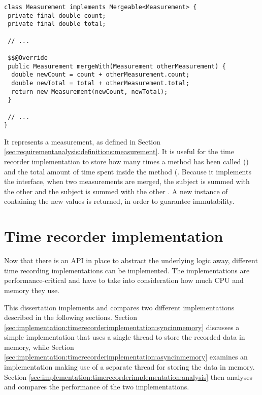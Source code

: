 \noindent\begin{minipage}[c]{\linewidth}
\begin{lstlisting}[breaklines,caption={Measurement class definition},label=lis:timerecorderapi:measurementclassdefinition]
class Measurement implements Mergeable<Measurement> {
 private final double count;
 private final double total;

 // ...

 $$@Override
 public Measurement mergeWith(Measurement otherMeasurement) {
  double newCount = count + otherMeasurement.count;
  double newTotal = total + otherMeasurement.total;
  return new Measurement(newCount, newTotal);
 }

 // ...
}
\end{lstlisting}
\end{minipage}

\noindent It represents a measurement, as defined in Section \ref{sec:requirementanalysis:definitions:measurement}. It is useful for the time recorder implementation to store how many times a method has been called () and the total amount of time spent inside the method (. Because it implements the  interface, when two measurements are merged, the subject  is summed with the other  and the subject  is summed with the other . A new instance of  containing the new values is returned, in order to guarantee immutability.

\section{Time recorder implementation}
\label{sec:implementation:timerecorderimplementation}

Now that there is an API in place to abstract the underlying logic away, different time recording implementations can be implemented. The implementations are performance-critical and have to take into consideration how much CPU and memory they use.

\noindent This dissertation implements and compares two different implementations described in the following sections. Section \ref{sec:implementation:timerecorderimplementation:syncinmemory} discusses a simple implementation that uses a single thread to store the recorded data in memory, while Section \ref{sec:implementation:timerecorderimplementation:asyncinmemory} examines an implementation making use of a separate thread for storing the data in memory. Section \ref{sec:implementation:timerecorderimplementation:analysis} then analyses and compares the performance of the two implementations.

